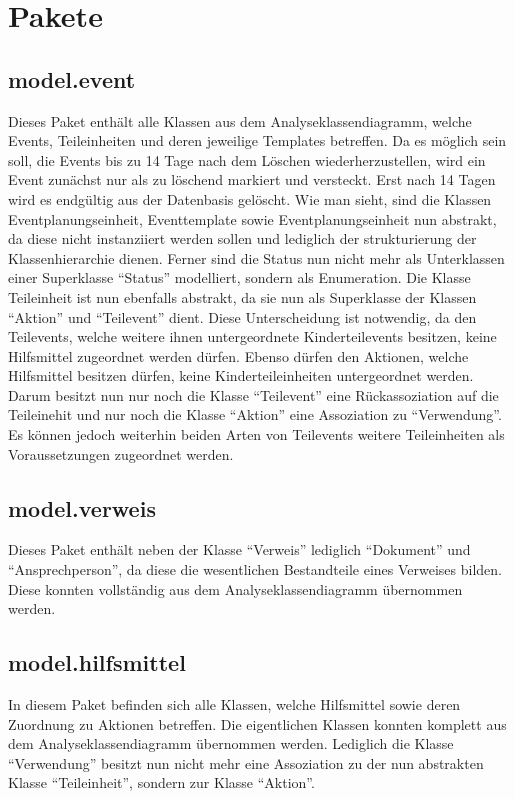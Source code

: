 \section{Pakete}

\subsection{model.event}
Dieses Paket enthält alle Klassen aus dem Analyseklassendiagramm, welche Events, Teileinheiten und deren jeweilige Templates betreffen. Da es möglich sein soll, die Events bis zu 14 Tage nach dem Löschen wiederherzustellen, wird ein Event zunächst nur als zu löschend markiert und versteckt. Erst nach 14 Tagen wird es  endgültig aus der Datenbasis gelöscht. Wie man sieht, sind die Klassen Eventplanungseinheit, Eventtemplate sowie Eventplanungseinheit nun abstrakt, da diese nicht instanziiert werden sollen und lediglich der strukturierung der Klassenhierarchie dienen. Ferner sind die Status nun nicht mehr als Unterklassen einer Superklasse \enquote{Status} modelliert, sondern als Enumeration. Die Klasse Teileinheit ist nun ebenfalls abstrakt, da sie nun als Superklasse der Klassen \enquote{Aktion} und \enquote{Teilevent} dient. Diese Unterscheidung ist notwendig, da den Teilevents, welche weitere ihnen untergeordnete Kinderteilevents besitzen, keine Hilfsmittel zugeordnet werden dürfen. Ebenso dürfen den Aktionen, welche Hilfsmittel besitzen dürfen, keine Kinderteileinheiten untergeordnet werden. Darum besitzt nun nur noch die Klasse \enquote{Teilevent} eine Rückassoziation auf die Teileinehit und nur noch die Klasse \enquote{Aktion} eine Assoziation zu \enquote{Verwendung}. Es können jedoch weiterhin beiden Arten von Teilevents weitere Teileinheiten als Voraussetzungen zugeordnet werden.

\subsection{model.verweis}
Dieses Paket enthält neben der Klasse \enquote{Verweis} lediglich \enquote{Dokument} und \enquote{Ansprechperson}, da diese die wesentlichen Bestandteile eines Verweises bilden. Diese konnten vollständig aus dem Analyseklassendiagramm übernommen werden.

\subsection{model.hilfsmittel}
In diesem Paket befinden sich alle Klassen, welche Hilfsmittel sowie deren Zuordnung zu Aktionen betreffen. Die eigentlichen Klassen konnten komplett aus dem Analyseklassendiagramm übernommen werden. Lediglich die Klasse \enquote{Verwendung} besitzt nun nicht mehr eine Assoziation zu der nun abstrakten Klasse \enquote{Teileinheit}, sondern zur Klasse \enquote{Aktion}.

